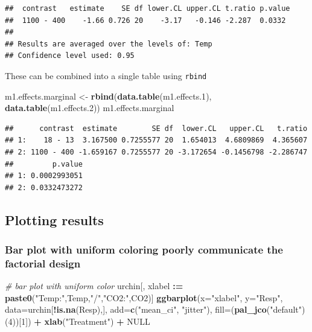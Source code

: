 \documentclass[]{book}
\newenvironment{Shaded}{\begin{snugshade}}{\end{snugshade}}
\newcommand{\CommentTok}[1]{\textcolor[rgb]{0.56,0.35,0.01}{\textit{#1}}}
\newcommand{\DataTypeTok}[1]{\textcolor[rgb]{0.13,0.29,0.53}{#1}}
\newcommand{\DecValTok}[1]{\textcolor[rgb]{0.00,0.00,0.81}{#1}}
\newcommand{\ErrorTok}[1]{\textcolor[rgb]{0.64,0.00,0.00}{\textbf{#1}}}
\newcommand{\FloatTok}[1]{\textcolor[rgb]{0.00,0.00,0.81}{#1}}
\newcommand{\KeywordTok}[1]{\textcolor[rgb]{0.13,0.29,0.53}{\textbf{#1}}}
\newcommand{\NormalTok}[1]{#1}
\newcommand{\OperatorTok}[1]{\textcolor[rgb]{0.81,0.36,0.00}{\textbf{#1}}}
\newcommand{\OtherTok}[1]{\textcolor[rgb]{0.56,0.35,0.01}{#1}}
\newcommand{\StringTok}[1]{\textcolor[rgb]{0.31,0.60,0.02}{#1}}
\begin{document}
\begin{verbatim}
##  contrast   estimate    SE df lower.CL upper.CL t.ratio p.value
##  1100 - 400    -1.66 0.726 20    -3.17   -0.146 -2.287  0.0332 
## 
## Results are averaged over the levels of: Temp 
## Confidence level used: 0.95
\end{verbatim}

These can be combined into a single table using \texttt{rbind}

\begin{Shaded}
\begin{Highlighting}[]
\NormalTok{m1.effects.marginal <-}\StringTok{ }\KeywordTok{rbind}\NormalTok{(}\KeywordTok{data.table}\NormalTok{(m1.effects}\FloatTok{.1}\NormalTok{), }\KeywordTok{data.table}\NormalTok{(m1.effects}\FloatTok{.2}\NormalTok{))}
\NormalTok{m1.effects.marginal}
\end{Highlighting}
\end{Shaded}

\begin{verbatim}
##      contrast  estimate        SE df  lower.CL   upper.CL   t.ratio
## 1:    18 - 13  3.167500 0.7255577 20  1.654013  4.6809869  4.365607
## 2: 1100 - 400 -1.659167 0.7255577 20 -3.172654 -0.1456798 -2.286747
##         p.value
## 1: 0.0002993051
## 2: 0.0332473272
\end{verbatim}

\hypertarget{plotting-results}{%
\subsection{Plotting results}\label{plotting-results}}

\hypertarget{bar-plot-with-uniform-coloring-poorly-communicate-the-factorial-design}{%
\subsubsection{Bar plot with uniform coloring poorly communicate the factorial design}\label{bar-plot-with-uniform-coloring-poorly-communicate-the-factorial-design}}

\begin{Shaded}
\begin{Highlighting}[]
\CommentTok{# bar plot with uniform color}
\NormalTok{urchin[, xlabel }\OperatorTok{:}\ErrorTok{=}\StringTok{ }\KeywordTok{paste0}\NormalTok{(}\StringTok{"Temp:"}\NormalTok{,Temp,}\StringTok{"/"}\NormalTok{,}\StringTok{"CO2:"}\NormalTok{,CO2)]}
\KeywordTok{ggbarplot}\NormalTok{(}\DataTypeTok{x=}\StringTok{"xlabel"}\NormalTok{,}
          \DataTypeTok{y=}\StringTok{"Resp"}\NormalTok{,}
          \DataTypeTok{data=}\NormalTok{urchin[}\OperatorTok{!}\KeywordTok{is.na}\NormalTok{(Resp),],}
          \DataTypeTok{add=}\KeywordTok{c}\NormalTok{(}\StringTok{"mean_ci"}\NormalTok{, }\StringTok{"jitter"}\NormalTok{),}
          \DataTypeTok{fill=}\NormalTok{(}\KeywordTok{pal_jco}\NormalTok{(}\StringTok{"default"}\NormalTok{)(}\DecValTok{4}\NormalTok{))[}\DecValTok{1}\NormalTok{]) }\OperatorTok{+}
\StringTok{  }\KeywordTok{xlab}\NormalTok{(}\StringTok{"Treatment"}\NormalTok{) }\OperatorTok{+}
\StringTok{  }\OtherTok{NULL}
\end{Highlighting}
\end{Shaded}
\end{document}
